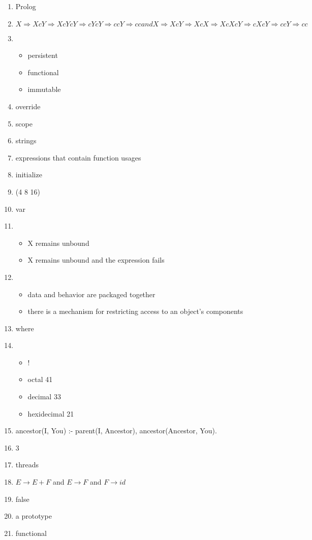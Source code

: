 \documentclass{exam}
\begin{document}
\begin{enumerate}
\item Prolog
\item $X \Rightarrow XcY \Rightarrow XcYcY \Rightarrow cYcY \Rightarrow ccY \Rightarrow cc and X \Rightarrow XcY \Rightarrow XcX \Rightarrow XcXcY \Rightarrow cXcY \Rightarrow ccY \Rightarrow cc$
\item \begin{itemize}
\item persistent
\item functional
\item immutable
\end{itemize}
\item override
\item scope
\item strings
\item expressions that contain function usages
\item initialize
\item (4 8 16)
\item var
\item \begin{itemize}
\item X remains unbound
\item X remains unbound and the expression fails
\end{itemize}
\item \begin{itemize}
\item data and behavior are packaged together
\item there is a mechanism for restricting access to an object's components
\end{itemize}
\item where
\item \begin{itemize}
\item !
\item octal 41
\item decimal 33
\item hexidecimal 21
\end{itemize}
\item ancestor(I, You) :- parent(I, Ancestor), ancestor(Ancestor, You). 
\item 3
\item threads
\item $E \rightarrow E + F$ and $E \rightarrow F$ and $F \rightarrow id$
\item false
\item a prototype
\item functional

\end{enumerate}
\end{document}
